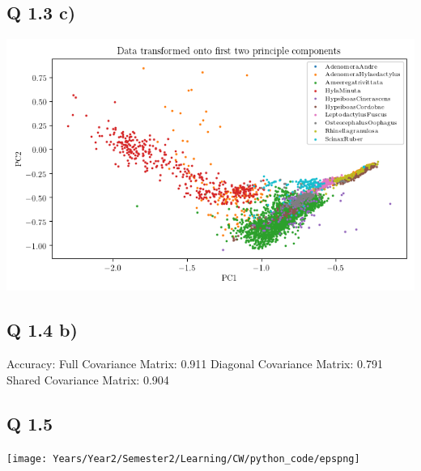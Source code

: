 \documentclass{report}
\begin{document}
\subsection*{Q 1.3 c)}
\includegraphics{Years/Year2/Semester2/Learning/CW/python_code/pca.png}
\subsection*{Q 1.4 b)}
Accuracy: 
Full Covariance Matrix: 0.911
Diagonal Covariance Matrix: 0.791
Shared Covariance Matrix: 0.904

\subsection{Q 1.5}
\texttt{[image: Years/Year2/Semester2/Learning/CW/python\_code/epspng]}
\end{document}

